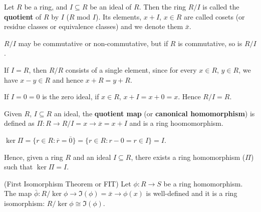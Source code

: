\begin{definition}
	Let $R$ be a ring, and $I \subseteq R$ be an ideal of $R$. Then the ring $R / I$ is called the \textbf{quotient} of $R$ by $I$ ($R$ mod $I$). Its elements, $x + I$, $x \in R$ are called cosets (or residue classes or equivalence classes) and we denote them $\bar{x}$.
	
	$R / I$ may be commutative or non-commutative, but if $R$ is commutative, so is $R / I$.

	If $I = R$, then $R / R$ consists of a single element, since for every $x \in R$, $y \in R$, we have $x - y \in R$ and hence $x + R = y + R$.

	If $I = 0 = {0}$ is the zero ideal, if $x \in R$, $x + I = x + 0 = x$. Hence $R / I = R$.
\end{definition}

\begin{definition}
	Given $R$, $I \subseteq R$ an ideal, the \textbf{quotient map} (or \textbf{canonical homomorphism}) is defined as $\Pi: R \rightarrow R / I = x \rightarrow \overline{x} = x + I$ and is a ring hoomomorphism.

	$\ker \Pi = \{r \in R: \overline{r} = \overline{0}\} = \{r \in R: r - 0 = r \in I\} = I$.
\end{definition}

Hence, given a ring $R$ and an ideal $I \subseteq R$, there exists a ring homomorphism ($\Pi$) such that $\ker \Pi = I$.

\begin{theorem}
	(First Isomorphism Theorem or FIT) Let $\phi: R \rightarrow S$ be a ring homomorphism. The map $\bar{\phi}: R / \ker \phi \rightarrow \Im(\phi) = \bar{x} \rightarrow \phi(x)$ is well-defined and it is a ring isomorphism: $R / \ker \phi \cong \Im(\phi)$.
\end{theorem}

